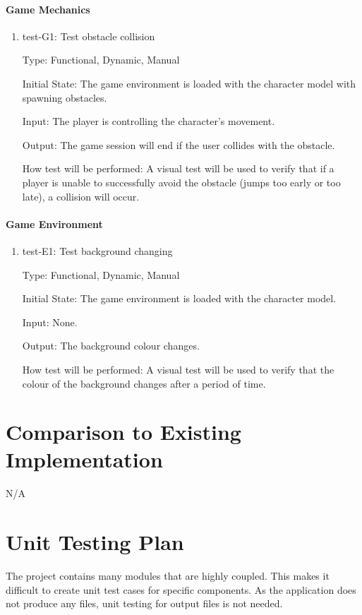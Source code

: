 \documentclass[12pt, titlepage]{article}
\begin{document}
\paragraph{Game Mechanics}	
\begin{enumerate}
\item{test-G1: Test obstacle collision\\}

Type: Functional, Dynamic, Manual
					
Initial State: The game environment is loaded with the character model with spawning obstacles.
					
Input: The player is controlling the character's movement.

Output: The game session will end if the user collides with the obstacle.
					
How test will be performed: A visual test will be used to verify that if a player is unable to successfully avoid the obstacle (jumps too early or too late), a collision will occur.
\end{enumerate}

\paragraph{Game Environment}
\begin{enumerate}
\item{test-E1: Test background changing\\}

Type: Functional, Dynamic, Manual
					
Initial State: The game environment is loaded with the character model.
					
Input: None.
					
Output: The background colour changes.
					
How test will be performed: A visual test will be used to verify that the colour of the background changes after a period of time.
\end{enumerate}


	
\section{Comparison to Existing Implementation}	
N/A

\section{Unit Testing Plan}
The project contains many modules that are highly coupled. This makes it difficult to create unit test cases for specific components. As the application does not produce any files, unit testing for output files is not needed. 
\end{document}
